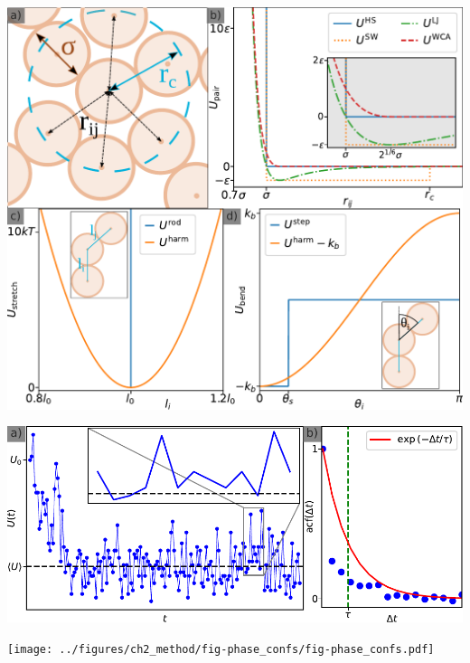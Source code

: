 \documentclass[aspectratio=169]{beamer}
\begin{document}
\begin{frame}[c]{}

  \centering
  \includegraphics[height=\textheight]{../figures/ch2_method/fig-potentials/fig-potentials.pdf}

\end{frame}

\begin{frame}[c]{}

  \centering
    \includegraphics[width=\textwidth]{../figures/ch2_method/fig-acf/fig-acf.pdf}

\end{frame}

\begin{frame}[c]{}

  \centering
    \texttt{[image: ../figures/ch2\_method/fig-phase\_confs/fig-phase\_confs.pdf]}

\end{frame}
\end{document}
